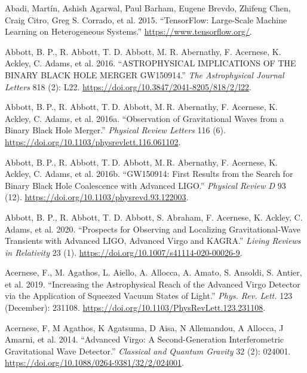\documentclass[10pt,a4paper,onecolumn]{article}
\newlength{\cslhangindent}
\newenvironment{CSLReferences}[3] %
 {%
  \setlength{\parindent}{0pt}
  \ifodd #1 \everypar{\setlength{\hangindent}{\cslhangindent}}\ignorespaces\fi
  \ifnum #2 > 0
  \setlength{\parskip}{#2\baselineskip}
  \fi
 }%
 {}
\begin{document}
\label{refs}
\begin{CSLReferences}{1}{0}
\bibitem[\citeproctext]{ref-tensorflow2015}
Abadi, Martín, Ashish Agarwal, Paul Barham, Eugene Brevdo, Zhifeng Chen,
Craig Citro, Greg S. Corrado, et al. 2015. {``{TensorFlow}: Large-Scale
Machine Learning on Heterogeneous Systems.''}
\url{https://www.tensorflow.org/}.

Abbott, B. P., R. Abbott, T. D. Abbott, M. R. Abernathy, F. Acernese, K.
Ackley, C. Adams, et al. 2016. {``ASTROPHYSICAL IMPLICATIONS OF THE
BINARY BLACK HOLE MERGER GW150914.''} \emph{The Astrophysical Journal
Letters} 818 (2): L22.
\url{https://doi.org/10.3847/2041-8205/818/2/l22}.

Abbott, B. P., R. Abbott, T. D. Abbott, M. R. Abernathy, F. Acernese, K.
Ackley, C. Adams, et al. 2016a. {``Observation of Gravitational Waves
from a Binary Black Hole Merger.''} \emph{Physical Review Letters} 116
(6). \url{https://doi.org/10.1103/physrevlett.116.061102}.

Abbott, B. P., R. Abbott, T. D. Abbott, M. R. Abernathy, F. Acernese, K.
Ackley, C. Adams, et al. 2016b. {``GW150914: First Results from the
Search for Binary Black Hole Coalescence with Advanced LIGO.''}
\emph{Physical Review D} 93 (12).
\url{https://doi.org/10.1103/physrevd.93.122003}.

Abbott, B. P., R. Abbott, T. D. Abbott, S. Abraham, F. Acernese, K.
Ackley, C. Adams, et al. 2020. {``Prospects for Observing and Localizing
Gravitational-Wave Transients with Advanced LIGO, Advanced Virgo and
KAGRA.''} \emph{Living Reviews in Relativity} 23 (1).
\url{https://doi.org/10.1007/s41114-020-00026-9}.

Acernese, F., M. Agathos, L. Aiello, A. Allocca, A. Amato, S. Ansoldi,
S. Antier, et al. 2019. {``Increasing the Astrophysical Reach of the
Advanced Virgo Detector via the Application of Squeezed Vacuum States of
Light.''} \emph{Phys. Rev. Lett.} 123 (December): 231108.
\url{https://doi.org/10.1103/PhysRevLett.123.231108}.

Acernese, F, M Agathos, K Agatsuma, D Aisa, N Allemandou, A Allocca, J
Amarni, et al. 2014. {``Advanced Virgo: A Second-Generation
Interferometric Gravitational Wave Detector.''} \emph{Classical and
Quantum Gravity} 32 (2): 024001.
\url{https://doi.org/10.1088/0264-9381/32/2/024001}.


\end{CSLReferences}
\end{document}
